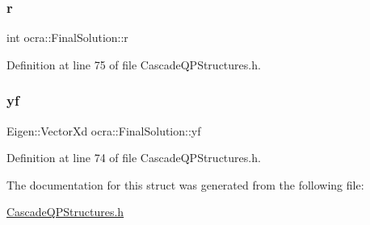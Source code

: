 \subsubsection{\texorpdfstring{r}{r}}
{\footnotesize\ttfamily int ocra\+::\+Final\+Solution\+::r}



Definition at line 75 of file Cascade\+Q\+P\+Structures.\+h.

\hypertarget{structocra_1_1FinalSolution_a10e9bf5b4c17125d9f3b8b807c627347}{}\label{structocra_1_1FinalSolution_a10e9bf5b4c17125d9f3b8b807c627347} 
\subsubsection{\texorpdfstring{yf}{yf}}
{\footnotesize\ttfamily Eigen\+::\+Vector\+Xd ocra\+::\+Final\+Solution\+::yf}



Definition at line 74 of file Cascade\+Q\+P\+Structures.\+h.



The documentation for this struct was generated from the following file\+:\begin{DoxyCompactItemize}
\item 
\hyperlink{CascadeQPStructures_8h}{Cascade\+Q\+P\+Structures.\+h}\end{DoxyCompactItemize}
